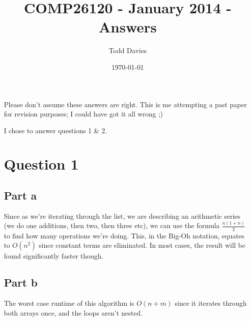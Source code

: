 \documentclass{article}
\author{Todd Davies}
\title{COMP26120 - January 2014 - Answers}
\date{\today}
\begin{document}
\lhead{\today}

\maketitle

\begin{center}
	\small Please don't assume these answers are right. This is me attempting a
	past paper for revision purposes; I could have got it all wrong ;)

  I chose to answer questions 1 \& 2.
\end{center}

\section*{Question 1}

\subsection*{Part a}



Since as we're iterating through the list, we are describing an arithmetic series
(we do one additions, then two, then three etc), we can use the formula
$\frac{n(1+n)}{2}$ to find how many operations we're doing. This, in the Big-Oh
notation, equates to $O(n^2)$ since constant terms are eliminated. In most
cases, the result will be found significantly faster though.

\newpage

\subsection*{Part b}



The worst case runtime of this algorithm is $O(n + m)$ since it iterates through
both arrays once, and the loops aren't nested.

\newpage
\end{document}
